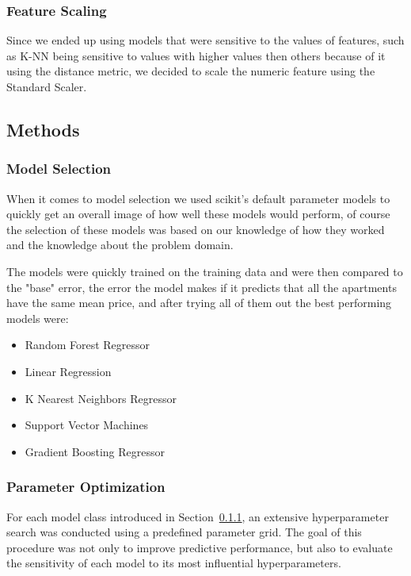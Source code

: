 \documentclass[11pt]{article}
\begin{document}
			\subsubsection{Feature Scaling}
			\label{subsubsec:Feature Scaling}


			\noindent Since we ended up using models that were sensitive to the values of features, such as K-NN being sensitive to values with higher values
			then others because of it using the distance metric, we decided to scale the numeric feature using the Standard Scaler.

		\subsection{Methods}
			\subsubsection{Model Selection}
				\label{subsubsec:Model Selection}

				\noindent When it comes to model selection we used scikit's default parameter models to quickly get an overall image of how well these models
				would perform, of course the selection of these models was based on our knowledge of how they worked and the knowledge about the problem domain. \newline

				\noindent The models were quickly trained on the training data and were then compared to the "base" error, the error the model makes
				if it predicts that all the apartments have the same mean price, and after trying all of them out the best performing models were:
				\begin{itemize}
					\item Random Forest Regressor
					\item Linear Regression
					\item K Nearest Neighbors Regressor
					\item Support Vector Machines
					\item Gradient Boosting Regressor
				\end{itemize}


			\subsubsection{Parameter Optimization}

				\noindent
				For each model class introduced in Section~\ref{subsubsec:Model Selection}, an extensive hyperparameter search was conducted using a predefined parameter grid.
				The goal of this procedure was not only to improve predictive performance, but also to evaluate the sensitivity of each model to its most influential hyperparameters.
\end{document}
